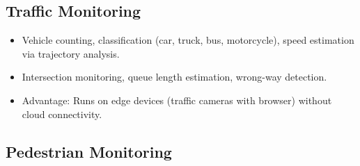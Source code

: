 \subsection{Traffic Monitoring}
\label{sec:traffic}
\begin{itemize}
    \item Vehicle counting, classification (car, truck, bus, motorcycle), speed estimation via trajectory analysis.
    \item Intersection monitoring, queue length estimation, wrong-way detection.
    \item Advantage: Runs on edge devices (traffic cameras with browser) without cloud connectivity.
\end{itemize}

\subsection{Pedestrian Monitoring}
\label{sec:pedestrian}

